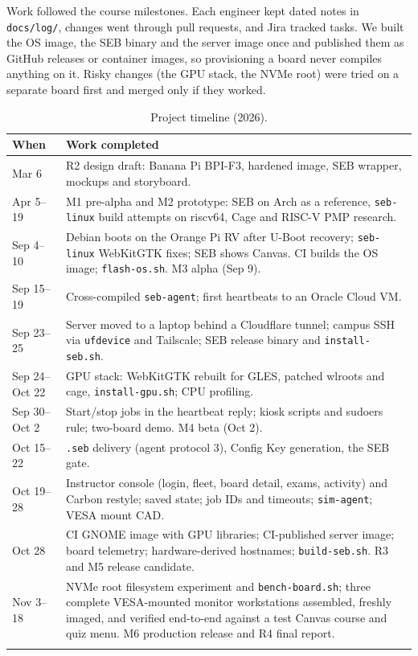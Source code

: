 \documentclass[11pt]{article}
\begin{document}
Work followed the course milestones. Each engineer kept dated notes in \texttt{docs/log/}, changes went through pull requests, and Jira tracked tasks. We built the OS image, the SEB binary and the server image once and published them as GitHub releases or container images, so provisioning a board never compiles anything on it. Risky changes (the GPU stack, the NVMe root) were tried on a separate board first and merged only if they worked.

\begin{longtable}{@{}p{}p{}@{}}
\toprule
\textbf{When} & \textbf{Work completed} \\
\midrule
\endhead
Mar 6 & R2 design draft: Banana Pi BPI-F3, hardened image, SEB wrapper, mockups and storyboard. \\
Apr 5--19 & M1 pre-alpha and M2 prototype: SEB on Arch as a reference, \texttt{seb-linux} build attempts on riscv64, Cage and RISC-V PMP research. \\
Sep 4--10 & Debian boots on the Orange Pi RV after U-Boot recovery; \texttt{seb-linux} WebKitGTK fixes; SEB shows Canvas. CI builds the OS image; \texttt{flash-os.sh}. M3 alpha (Sep 9). \\
Sep 15--19 & Cross-compiled \texttt{seb-agent}; first heartbeats to an Oracle Cloud VM. \\
Sep 23--25 & Server moved to a laptop behind a Cloudflare tunnel; campus SSH via \texttt{ufdevice} and Tailscale; SEB release binary and \texttt{install-seb.sh}. \\
Sep 24--Oct 22 & GPU stack: WebKitGTK rebuilt for GLES, patched wlroots and cage, \texttt{install-gpu.sh}; CPU profiling. \\
Sep 30--Oct 2 & Start/stop jobs in the heartbeat reply; kiosk scripts and sudoers rule; two-board demo. M4 beta (Oct 2). \\
Oct 15--22 & \texttt{.seb} delivery (agent protocol 3), Config Key generation, the SEB gate. \\
Oct 19--28 & Instructor console (login, fleet, board detail, exams, activity) and Carbon restyle; saved state; job IDs and timeouts; \texttt{sim-agent}; VESA mount CAD. \\
Oct 28 & CI GNOME image with GPU libraries; CI-published server image; board telemetry; hardware-derived hostnames; \texttt{build-seb.sh}. R3 and M5 release candidate. \\
Nov 3--18 & NVMe root filesystem experiment and \texttt{bench-board.sh}; three complete VESA-mounted monitor workstations assembled, freshly imaged, and verified end-to-end against a test Canvas course and quiz menu. M6 production release and R4 final report. \\
\bottomrule
\caption{Project timeline (2026).}
\label{tab:timeline}
\end{longtable}
\end{document}
